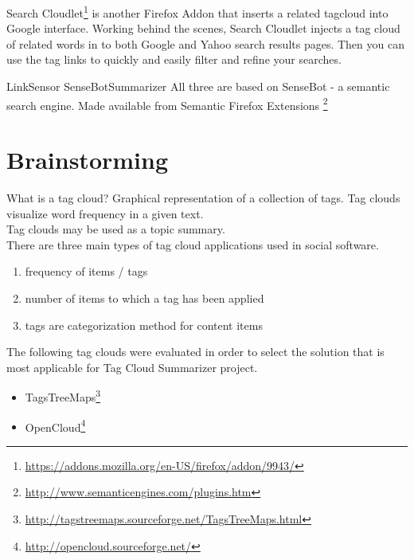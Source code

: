 Search Cloudlet\footnote{\url{https://addons.mozilla.org/en-US/firefox/addon/9943/}} is another Firefox Addon that inserts a related tagcloud into Google interface. Working behind the scenes, Search Cloudlet injects a tag cloud of related words in to both Google and Yahoo search results pages. Then you can use the tag links to quickly and easily filter and refine your searches.



LinkSensor
SenseBotSummarizer
All three are based on SenseBot - a semantic search engine.
Made available from Semantic Firefox Extensions \footnote{\url{http://www.semanticengines.com/plugins.htm}}\\

\section{Brainstorming}
What is a tag cloud? Graphical representation of a collection of tags. Tag clouds visualize word frequency in a given text.\\

Tag clouds may be used as a topic summary.\\

There are three main types of tag cloud applications used in social software.\\
\begin{enumerate}
\item frequency of items / tags
\item number of items to which a tag has been applied
\item tags are categorization method for content items 
\end{enumerate}
The following tag clouds were evaluated in order to select the solution that is most applicable for Tag Cloud Summarizer project.\\
\begin{itemize}
\item TagsTreeMaps\footnote{\url{http://tagstreemaps.sourceforge.net/TagsTreeMaps.html}}
\item OpenCloud\footnote{\url{http://opencloud.sourceforge.net/}}
\end{itemize}
